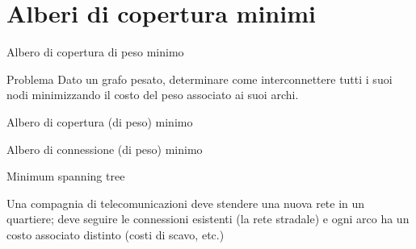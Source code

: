 \section{Alberi di copertura minimi}

\begin{frame}{Albero di copertura di peso minimo}
\vspace{-6pt}
\begin{block}{Problema}
Dato un grafo pesato, determinare come interconnettere tutti i suoi nodi
minimizzando il costo del peso associato ai suoi archi.
\BI
\item \alert{Albero di copertura (di peso) minimo}
\item \alert{Albero di connessione (di peso) minimo}
\item \alert	{Minimum spanning tree}
\EI
\end{block}

\medskip
{}
Una compagnia di telecomunicazioni deve stendere una nuova rete
in un quartiere; deve seguire le connessioni esistenti (la rete stradale)
e ogni arco ha un costo associato distinto (costi di scavo, etc.)
\end{frame}

